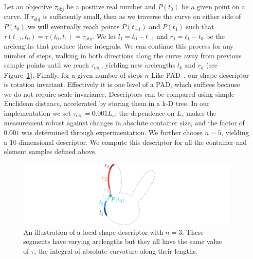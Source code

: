 Let an objective $\tau_\mathrm{obj}$ be a positive real number and $P(t_0)$ be a given point on a curve.  If $\tau_\mathrm{obj}$ is sufficiently small, then as we traverse the curve on either side of $P(t_0)$ we will eventually reach points $P(t_{-1})$ and $P(t_1)$ such that $\tau(t_{-1},t_0)=\tau(t_0,t_1)=\tau_\mathrm{obj}$.  We let $l_1=t_0-t_{-1}$ and $r_1=t_1-t_0$ be the arclengths that produce these integrals.  We can continue this process for any number of steps, walking in both directions along the curve away from previous sample points until we reach $\tau_\mathrm{obj}$, yielding new arclengths $l_k$ and $r_k$ (see Figure~\ref{fig_shape_matching}).  Finally, for a given number of steps $n$ 
Like PAD~\cite{Kwan2016}, our shape descriptor is rotation 
invariant.  Effectively it is one level of a PAD, which suffices because
we do not require scale invariance.
Descriptors can be compared using simple Euclidean distance, accelerated
by storing them in a k-D tree.
In our implementation we set $\tau_\mathrm{obj}=0.001L_s$; the dependence
on $L_s$ makes the measurement robust against changes in absolute container
size, and the factor of $0.001$ was determined through experimentation.
We further choose $n=5$, yielding a 10-dimensional descriptor. We compute
this descriptor for all the container and element samples defined above.

\begin{figure}[t]
\centering
\includegraphics[width=1.0\textwidth]{figures/repulsionpak/descriptor_2.pdf}
\caption[A local shape descriptor for shape matching]
{\label{fig_shape_matching}
An illustration of a local shape descriptor with $n = 3$. 
These segments have varying arclengths but they all have the same value
of $\tau$, the integral of absolute curvature along their lengths.
}
\end{figure}



